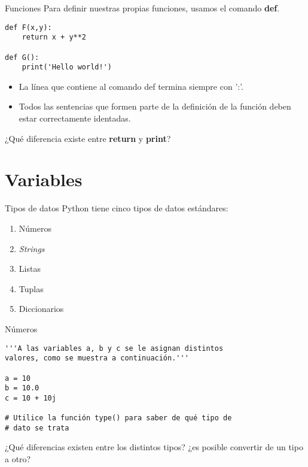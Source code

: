 \documentclass[10pt]{beamer}
\begin{document}
\begin{frame}[fragile]{Funciones}
Para definir nuestras propias funciones, usamos el comando \textbf{def}.

\begin{verbatim}
def F(x,y):
	return x + y**2
	
def G():
	print('Hello world!')
\end{verbatim}

\begin{itemize}
		\item La línea que contiene al comando def termina siempre con ':'.
		\item Todos las sentencias que formen parte de la definición de la función deben estar correctamente identadas.
\end{itemize}
\begin{center}
		¿Qué diferencia existe entre \textbf{return} y \textbf{print}?
\end{center}

\end{frame}

\section{Variables}
\begin{frame}[fragile]{Tipos de datos}
	Python tiene cinco \alert{tipos de datos estándares}:
	\begin{enumerate}
		\item Números
		\item \emph{Strings}
		\item Listas
		\item Tuplas
		\item Diccionarios
	\end{enumerate}
\end{frame}

\begin{frame}[fragile]{Números}
\begin{verbatim}
'''A las variables a, b y c se le asignan distintos 
valores, como se muestra a continuación.'''

a = 10 
b = 10.0
c = 10 + 10j
	
# Utilice la función type() para saber de qué tipo de
# dato se trata
\end{verbatim}
\begin{center}
	¿Qué diferencias existen entre los distintos tipos? ¿es posible convertir de un tipo a otro?
\end{center}
\end{frame}
\end{document}
